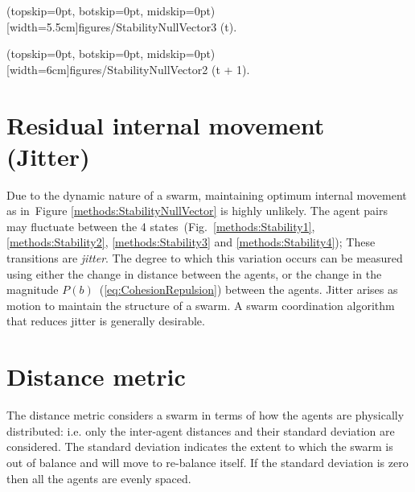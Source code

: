 \documentclass{ieeeaccess}
\begin{document}
\Figure[t!](topskip=0pt, botskip=0pt, midskip=0pt)[width=5.5cm]{figures/StabilityNullVector3}
{(t).\label{concave:VoidPerimeter1}}


\Figure[t!](topskip=0pt, botskip=0pt, midskip=0pt)[width=6cm]{figures/StabilityNullVector2}
{(t + 1).\label{concave:VoidPerimeter2}}


\section{Residual internal movement (Jitter)}\label{metric:Jitter}
Due to the dynamic nature of a swarm, maintaining optimum internal movement as in~Figure \ref{methods:StabilityNullVector} is highly unlikely. The agent pairs may fluctuate between the 4 states~(Fig.~\ref{methods:Stability1}, \ref{methods:Stability2}, \ref{methods:Stability3} and \ref{methods:Stability4}); These transitions are \emph{jitter}. The degree to which this variation occurs can be measured using either the change in distance between the agents, or the change in the magnitude $P(b)$~(\ref{eq:CohesionRepulsion}) between the agents. Jitter arises as motion to maintain the structure of a swarm. A swarm coordination algorithm that reduces jitter is generally desirable. 

\section{Distance metric\label{section:DistanceDynamics}}
The distance metric considers a swarm in terms of how the agents are physically distributed: i.e. only the inter-agent distances and their standard deviation are considered. The standard deviation indicates the extent to which the swarm is out of balance and will move to re-balance itself. If the standard deviation is zero then all the agents are evenly spaced. 
\end{document}
